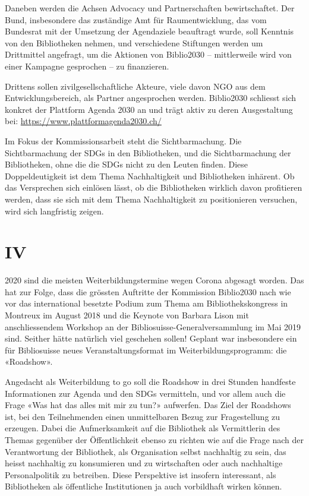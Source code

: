 \documentclass[a4paper,
fontsize=11pt,
oneside,
numbers=noperiodatend,
parskip=half-,
bibliography=totoc,
final
]{scrartcl}
\begin{document}
Daneben werden die Achsen Advocacy und Partnerschaften bewirtschaftet.
Der Bund, insbesondere das zuständige Amt für Raumentwicklung, das vom
Bundesrat mit der Umsetzung der Agendaziele beauftragt wurde, soll
Kenntnis von den Bibliotheken nehmen, und verschiedene Stiftungen werden
um Drittmittel angefragt, um die Aktionen von Biblio2030 -- mittlerweile
wird von einer Kampagne gesprochen -- zu finanzieren.

Drittens sollen zivilgesellschaftliche Akteure, viele davon NGO aus dem
Entwicklungsbereich, als Partner angesprochen werden. Biblio2030
schliesst sich konkret der Plattform Agenda 2030 an und trägt aktiv zu
deren Ausgestaltung bei: \url{https://www.plattformagenda2030.ch/}

Im Fokus der Kommissionsarbeit steht die Sichtbarmachung. Die
Sichtbarmachung der SDGs in den Bibliotheken, und die Sichtbarmachung
der Bibliotheken, ohne die die SDGs nicht zu den Leuten finden. Diese
Doppeldeutigkeit ist dem Thema Nachhaltigkeit und Bibliotheken inhärent.
Ob das Versprechen sich einlösen lässt, ob die Bibliotheken wirklich
davon profitieren werden, dass sie sich mit dem Thema Nachhaltigkeit zu
positionieren versuchen, wird sich langfristig zeigen.

\hypertarget{iv}{%
\section{IV}\label{iv}}

2020 sind die meisten Weiterbildungstermine wegen Corona abgesagt
worden. Das hat zur Folge, dass die grössten Auftritte der Kommission
Biblio2030 nach wie vor das international besetzte Podium zum Thema am
Bibliothekskongress in Montreux im August 2018 und die Keynote von
Barbara Lison mit anschliessendem Workshop an der
Bibliosuisse-Generalversammlung im Mai 2019 sind. Seither hätte
natürlich viel geschehen sollen! Geplant war insbesondere ein für
Bibliosuisse neues Veranstaltungsformat im Weiterbildungsprogramm: die
«Roadshow».

Angedacht als Weiterbildung to go soll die Roadshow in drei Stunden
handfeste Informationen zur Agenda und den SDGs vermitteln, und vor
allem auch die Frage «Was hat das alles mit mir zu tun?» aufwerfen. Das
Ziel der Roadshows ist, bei den Teilnehmenden einen unmittelbaren Bezug
zur Fragestellung zu erzeugen. Dabei die Aufmerksamkeit auf die
Bibliothek als Vermittlerin des Themas gegenüber der Öffentlichkeit
ebenso zu richten wie auf die Frage nach der Verantwortung der
Bibliothek, als Organisation selbst nachhaltig zu sein, das heisst
nachhaltig zu konsumieren und zu wirtschaften oder auch nachhaltige
Personalpolitik zu betreiben. Diese Perspektive ist insofern
interessant, als Bibliotheken als öffentliche Institutionen ja auch
vorbildhaft wirken können.
\end{document}
